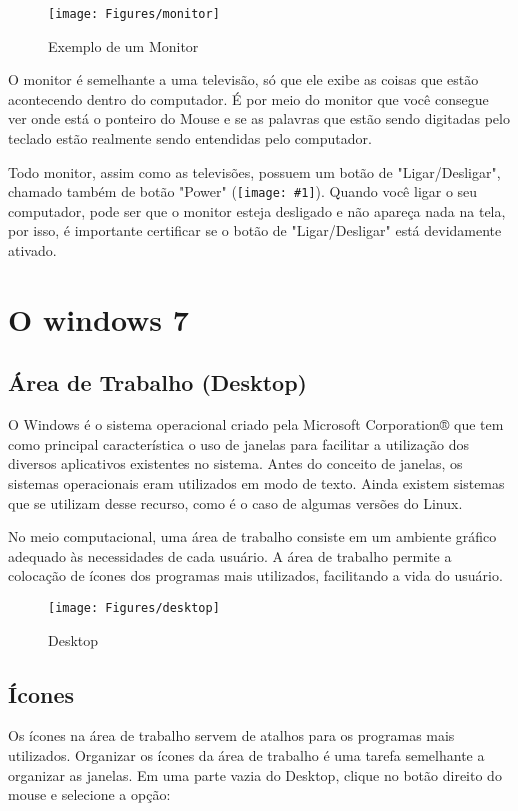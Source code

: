 \documentclass[hidelinks,12pt]{article}
\newcommand{\icon}[1]{\texttt{[image: \#1]}}
\begin{document}
\begin{figure}[!h]
        \centering
		\texttt{[image: Figures/monitor]}
		\label{fig:monitor}
		\caption{Exemplo de um Monitor}
\end{figure}

O monitor é semelhante a uma televisão, só que ele exibe as coisas que estão acontecendo dentro do computador. É por meio do monitor que você consegue ver onde está o ponteiro do Mouse e se as palavras que estão sendo digitadas pelo teclado estão realmente sendo entendidas pelo computador.

Todo monitor, assim como as televisões, possuem um botão de "Ligar/Desligar", chamado também de botão "Power" (\icon{Figures/power}). Quando você ligar o seu computador, pode ser que o monitor esteja desligado e não apareça nada na tela, por isso, é importante certificar se o botão de "Ligar/Desligar" está devidamente ativado.

\section{O windows 7}
\subsection{Área de Trabalho (Desktop)}

O Windows é o sistema operacional criado pela Microsoft Corporation® que tem como principal característica o uso de janelas para facilitar a utilização dos diversos aplicativos existentes no sistema. Antes do conceito de janelas, os sistemas operacionais eram utilizados em modo de texto. Ainda existem sistemas que se utilizam desse recurso, como é o caso de algumas versões do Linux.

No meio computacional, uma área de trabalho consiste em um ambiente gráfico adequado às necessidades de cada usuário. A área de trabalho permite a colocação de ícones dos programas mais utilizados, facilitando a vida do usuário.\\

\begin{figure}[!hb]
	\centering
	\texttt{[image: Figures/desktop]}
	\caption{Desktop}
	\label{fig:desktop}
\end{figure}


\subsection{Ícones}
	Os ícones na área de trabalho servem de atalhos para os programas mais utilizados.
	Organizar os ícones da área de trabalho é uma tarefa semelhante a organizar as janelas. Em uma parte vazia do Desktop, clique no botão direito do mouse e selecione a opção:
\end{document}
